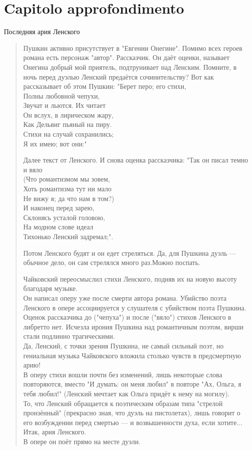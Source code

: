 \chapter{Capitolo approfondimento}\label{section:app}%


Последняя ария Ленского
\begin{verse}
Пушкин активно присутствует в "Евгении Онегине". 
Помимо всех героев романа есть персонаж "автор". Рассказчик. Он даёт оценки, называет Онегина добрый мой приятель, подтрунивает над Ленским. 
Помните, в ночь перед дуэлью Ленский предаётся сочинительству? Вот как рассказывает об этом Пушкин: "Берет перо; его стихи,\\
Полны любовной чепухи,\\
Звучат и льются. Их читает\\
Он вслух, в лирическом жару,\\
Как Дельвиг пьяный на пиру.\\
Стихи на случай сохранились;\\
Я их имею; вот они:"

Далее текст от Ленского. И снова оценка рассказчика: 
"Так он писал темно и вяло\\
(Что романтизмом мы зовем,\\
Хоть романтизма тут ни мало\\
Не вижу я; да что нам в том?)\\
И наконец перед зарею,\\
Склонясь усталой головою,\\
На модном слове идеал\\
Тихонько Ленский задремал;".

Потом Ленского будят и он едет стреляться. Да, для Пушкина дуэль — обычное дело, он сам стрелялся много раз.Можно поспать.

Чайковский переосмыслил стихи Ленского, подняв их на новую высоту благодаря музыке.\\
Он написал оперу уже после смерти автора романа. Убийство поэта Ленского в опере ассоциируется у слушателя с убийством поэта Пушкина. Оценок рассказчика до ("чепуха") и после ("вяло") стихов Ленского в либретто нет. Исчезла ирония Пушкина над романтичным поэтом, вирши стали подлинно трагическими.\\
Да, Ленский, с точки зрения Пушкина, не самый сильный поэт, но гениальная музыка Чайковского вложила столько чувств в предсмертную арию!\\
В оперу стихи вошли почти без изменений, лишь некоторые слова повторяются, вместо "И думать: он меня любил" в повторе "Ах, Ольга, я тебя любил!" (Ленский мечтает как Ольга придёт к нему на могилу).\\
То, что Ленский обращается к поэтическим образам типа "стрелой пронзённый" (прекрасно зная, что дуэль на пистолетах), лишь говорит о его возбуждении перед смертью — и возвышенности духа, если хотите... Итак, ария Ленского.\\
В опере он поёт прямо на месте дуэли.


\end{verse}
